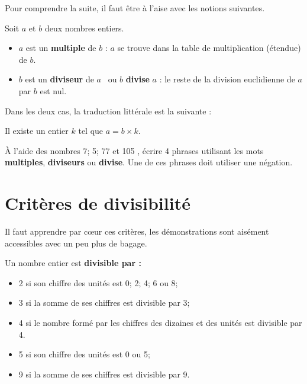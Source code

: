 \documentclass[a4paper]{book}
\begin{document}
    
    Pour comprendre la suite, il faut être à l'aise avec les notions suivantes.
    \begin{definition}
        Soit $a$ et $b$ deux nombres entiers.
        \begin{itemize}
            \item \og $a$ est un \textbf{multiple} de $b$ \fg : $a$ se trouve dans la table de multiplication (étendue) de $b$.

            \item \og $b$ est un \textbf{diviseur} de $a$ \fg \, ou \og $b$ \textbf{divise} $a$ \fg : le reste de la division euclidienne de $a$ par $b$ est nul. 
        \end{itemize}

        Dans les deux cas, la traduction littérale est la suivante : 

        \og Il existe un entier $k$ tel que $a=b\times k$. \fg
    \end{definition}


    \begin{exemple}
        À l'aide des nombres 7; 5; 77 et 105 , écrire 4 phrases utilisant les mots \textbf{multiples}, \textbf{diviseurs} ou \textbf{divise}. Une de ces phrases doit utiliser une négation.

        \begin{minipage}{0.45\linewidth}  
            \text{}
            \vspace{3cm}
        \end{minipage}
        \hfill
        \vline
        \hfill
        \begin{minipage}{0.45\linewidth}
            \text{}
             
            \vspace{3cm}
        \end{minipage}
    \end{exemple}

    
\section{Critères de divisibilité}
    Il faut apprendre par cœur ces critères, les démonstrations sont aisément accessibles avec un peu plus de bagage.

    \begin{propriete}
        Un nombre entier est \textbf{divisible par :}
            \begin{itemize}
                \item 2 si son chiffre des unités est 0; 2; 4; 6 ou 8;
                \item 3 si la somme de ses chiffres est divisible par 3;
                \item 4 si le nombre formé par les chiffres des dizaines et des unités est divisible par 4.
                \item 5 si son chiffre des unités est 0 ou 5;
                \item 9 si la somme de ses chiffres est divisible par 9.
            \end{itemize}
    \end{propriete}
\end{document}
